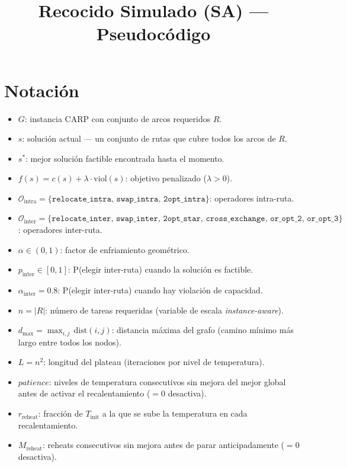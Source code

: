 \documentclass[12pt, a4paper]{article}
\title{Recocido Simulado (SA) --- Pseudocódigo}
\author{}
\date{}
\begin{document}
\maketitle

\section{Notación}

\begin{itemize}
    \item $G$: instancia CARP con conjunto de arcos requeridos $R$.
    \item $s$: solución actual --- un conjunto de rutas que cubre todos los arcos
          de $R$.
    \item $s^{*}$: mejor solución factible encontrada hasta el momento.
    \item $f(s) = c(s) + \lambda \cdot \mathrm{viol}(s)$: objetivo penalizado
          ($\lambda > 0$).
    \item $\mathcal{O}_{\mathrm{intra}} = \{\texttt{relocate\_intra},\,
          \texttt{swap\_intra},\, \texttt{2opt\_intra}\}$: operadores
          intra-ruta.
    \item $\mathcal{O}_{\mathrm{inter}} = \{\texttt{relocate\_inter},\,
          \texttt{swap\_inter},\, \texttt{2opt\_star},\,
          \texttt{cross\_exchange},\, \texttt{or\_opt\_2},\,
          \texttt{or\_opt\_3}\}$: operadores inter-ruta.
    \item $\alpha \in (0,1)$: factor de enfriamiento geométrico.
    \item $p_{\mathrm{inter}} \in [0,1]$: P(elegir inter-ruta) cuando la
          solución es factible.
    \item $\alpha_{\mathrm{inter}} = 0.8$: P(elegir inter-ruta) cuando hay
          violación de capacidad.
    \item $n = |R|$: número de tareas requeridas (variable de escala
          \emph{instance-aware}).
    \item $d_{\max} = \max_{i,j}\,\mathrm{dist}(i,j)$: distancia máxima
          del grafo (camino mínimo más largo entre todos los nodos).
    \item $L = n^{2}$: longitud del plateau (iteraciones por nivel de temperatura).
    \item $\mathit{patience}$: niveles de temperatura consecutivos sin mejora del
          mejor global antes de activar el recalentamiento ($= 0$ desactiva).
    \item $r_{\mathrm{reheat}}$: fracción de $T_{\mathrm{init}}$ a la que se
          sube la temperatura en cada recalentamiento.
    \item $M_{\mathrm{reheat}}$: reheats consecutivos sin mejora antes de parar
          anticipadamente ($= 0$ desactiva).
\end{itemize}
\end{document}
